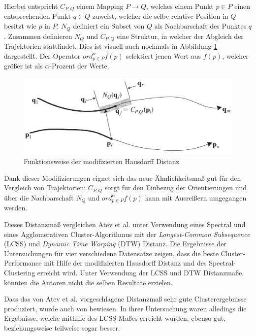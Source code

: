 Hierbei entspricht $C_{P,Q}$ einem Mapping $P \rightarrow Q$, welches einem Punkt $p \in P$ einen entsprechenden
Punkt $q \in Q$ zuweist, welcher die selbe relative Position in $Q$ besitzt wie $p$ in $P$.
$N_Q$ definiert ein Subset von $Q$ als Nachbarschaft des Punktes $q$. Zusammen definieren $N_Q$ und $C_{P,Q}$ eine
Struktur, in welcher der Abgleich der Trajektorien stattfindet. Dies ist visuell auch nochmals in Abbildung
\ref{fig:relw_atev_modh} dargestellt. Der Operator $ord_{p \in P}^{\alpha} f(p)$ selektiert jenen Wert aus $f(p)$, welcher
größer ist als $\alpha$-Prozent der Werte. 

\begin{figure}[H]
    \centering
    \includegraphics[width=0.6\linewidth]{../resources/img/RelatedWork/Atev_modHausdorff}
    \caption[Funktionsweise der modifizierten Hausdorff Distanz]{Funktionsweise der modifizierten Hausdorff Distanz \cite[]{Atev2010}}
    \label{fig:relw_atev_modh}
\end{figure}

Dank dieser Modifizierungen eignet sich das neue Ähnlichkeitsmaß gut für den Vergleich von Trajektorien:
$C_{P,Q}$ sorgt für den Einbezug der Orientierungen und über die Nachbarschaft $N_Q$ und $ord_{p \in P}^{\alpha} f(p)$
kann mit Ausreißern umgegangen werden.

Dieses Distanzmaß vergleichen Atev et al. unter Verwendung eines Spectral und eines Agglomerativen
Cluster-Algorithmus mit der \textit{Longest-Common Subsequence} (LCSS) und \textit{Dynamic Time Warping} (DTW) Distanz.
Die Ergebnisse der Untersuchungen für vier verschiedene Datensätze zeigen, dass die beste Cluster-Performance
mit Hilfe der modifizierten Hausdorff Distanz und des Spectral-Clustering erreicht wird.
Unter Verwendung der LCSS und DTW Distanzmaße, könnten die Autoren nicht die selben Resultate erzielen.

Dass das von Atev et al. vorgeschlagene Distanzmaß sehr gute Clusterergebnisse produziert, wurde auch von \cite{Morris2009}
bewiesen. In ihrer Untersuchung waren alledings die Ergebnisse, welche mithilfe des LCSS Maßes erreicht wurden,
ebenso gut, beziehungsweise teilweise sogar besser.

